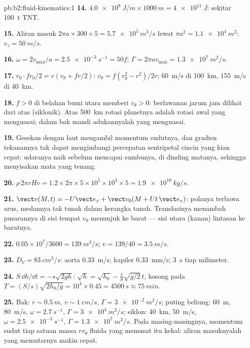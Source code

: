 \begin{solution}{pb:b2:fluid-kinematics:1}
\textbf{14.} $\qty{4.0e8}{J/m} \times \qty{1000}{m} = \qty{4e11}{J}$: sekitar
\qty{100}{t} TNT.

\textbf{15.} Aliran masuk $2\pi a \times 300 \times 5 = \qty{5.7e5}{m^3/s}$ lewat
$\pi a^2 = \qty{1.1e4}{m^2}$: $v_z = \qty{50}{m/s}$.

\textbf{16.} $\omega = 2v_{\max}/a = \qty{2.5e-3}{s^{-1}} = 50f$; $\Gamma = 2\pi av_{\max}
= \qty{1.3e7}{m^2/s}$.

\textbf{17.} $r_0\cdot fr_0/2 = r(v_\theta + fr/2)$: $v_\theta = f(r_0^2 - r^2)/2r$;
\qty{60}{m/s} di \qty{100}{km}, \qty{155}{m/s} di \qty{40}{km}.

\textbf{18.} $f > 0$ di belahan bumi utara memberi $v_\theta > 0$:
berlawanan jarum jam dilihat dari atas (siklonik). Atas \qty{500}{km} rotasi
planetnya adalah rotasi awal yang menguasai; dalam bak mandi
adukannyalah yang menguasai.

\textbf{19.} Gesekan dengan laut mengambil momentum sudutnya, dan
gradien tekanannya tak dapat mengimbangi percepatan sentripetal cincin
yang kian cepat: udaranya naik sebelum mencapai sumbunya, di dinding
matanya, sehingga menyisakan mata yang tenang.

\textbf{20.} $\rho\,2\pi rHv = 1.2 \times 2\pi \times 5 \times 10^5 \times 10^3 \times 5 =
\qty{1.9e10}{kg/s}$.

\textbf{21.} $\vect v(M, t) = -U\vect e_x + \vect v_0(M + Ut\,\vect e_x)$: polanya
terbawa arus, medannya tak tunak dalam kerangka tanah.
Translasinya menambah pusarannya di sisi tempat $v_\theta$ menunjuk
ke barat --- sisi utara (kanan) lintasan ke baratnya.

\textbf{22.} $0.05 \times 10^7/3600 = \qty{139}{m^3/s}$; $v = 139/40 = \qty{3.5}{m/s}$.

\textbf{23.} $D_V = \qty{83}{cm^3/s}$: aorta \qty{0.33}{m/s}; kapiler
\qty{0.33}{mm/s}; \qty{3}{s} tiap milimeter.

\textbf{24.} $S\,\dd h/\dd t = -s\sqrt{2gh}$: $\sqrt h = \sqrt{h_0} -
\frac sS\sqrt{g/2}\,t$, kosong pada $T = (S/s)\sqrt{2h_0/g} = 10^4 \times 0.45 =
\qty{4500}{s} \approx \qty{75}{min}$.

\textbf{25.} Bak: $r \sim \qty{0.5}{m}$, $v \sim \qty{1}{cm/s}$, $\Gamma =
\qty{3e-2}{m^2/s}$; puting beliung: \qty{60}{m}, \qty{80}{m/s}, $\omega = \qty{2.7}{s^{-1}}$,
$\Gamma = \qty{3e4}{m^2/s}$; siklon: \qty{40}{km}, \qty{50}{m/s}, $\omega =
\qty{2.5e-3}{s^{-1}}$, $\Gamma = \qty{1.3e7}{m^2/s}$. Pada masing-masingnya, momentum
sudut tiap satuan massa $rv_\theta$ fluida yang memusat itu kekal:
aliran masuknyalah yang memutarnya makin cepat.
\end{solution}
